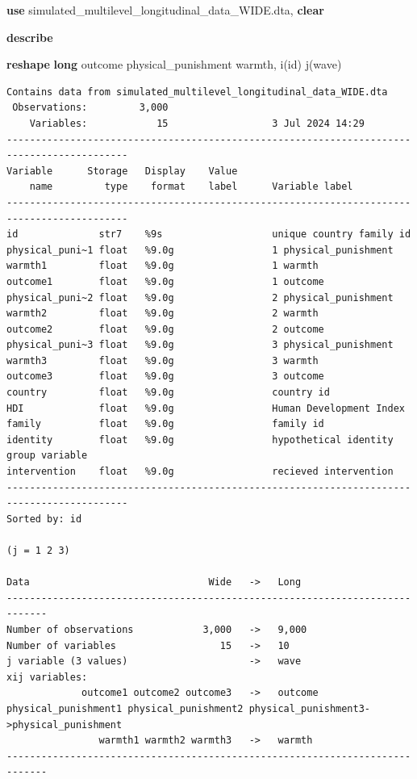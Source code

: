 \documentclass[
  letterpaper,
  DIV=11,
  numbers=noendperiod]{scrreprt}
\newenvironment{Shaded}{\begin{snugshade}}{\end{snugshade}}
\newcommand{\KeywordTok}[1]{\textcolor[rgb]{0.00,0.23,0.31}{\textbf{#1}}}
\newcommand{\NormalTok}[1]{\textcolor[rgb]{0.00,0.23,0.31}{#1}}
\begin{document}
\begin{Shaded}
\begin{Highlighting}[]

\KeywordTok{use}\NormalTok{ simulated\_multilevel\_longitudinal\_data\_WIDE.dta, }\KeywordTok{clear}

\KeywordTok{describe}

\KeywordTok{reshape} \KeywordTok{long}\NormalTok{ outcome physical\_punishment warmth, i(id) j(wave)}
\end{Highlighting}
\end{Shaded}

\begin{verbatim}
Contains data from simulated_multilevel_longitudinal_data_WIDE.dta
 Observations:         3,000                  
    Variables:            15                  3 Jul 2024 14:29
-------------------------------------------------------------------------------------------
Variable      Storage   Display    Value
    name         type    format    label      Variable label
-------------------------------------------------------------------------------------------
id              str7    %9s                   unique country family id
physical_puni~1 float   %9.0g                 1 physical_punishment
warmth1         float   %9.0g                 1 warmth
outcome1        float   %9.0g                 1 outcome
physical_puni~2 float   %9.0g                 2 physical_punishment
warmth2         float   %9.0g                 2 warmth
outcome2        float   %9.0g                 2 outcome
physical_puni~3 float   %9.0g                 3 physical_punishment
warmth3         float   %9.0g                 3 warmth
outcome3        float   %9.0g                 3 outcome
country         float   %9.0g                 country id
HDI             float   %9.0g                 Human Development Index
family          float   %9.0g                 family id
identity        float   %9.0g                 hypothetical identity group variable
intervention    float   %9.0g                 recieved intervention
-------------------------------------------------------------------------------------------
Sorted by: id

(j = 1 2 3)

Data                               Wide   ->   Long
-----------------------------------------------------------------------------
Number of observations            3,000   ->   9,000       
Number of variables                  15   ->   10          
j variable (3 values)                     ->   wave
xij variables:
             outcome1 outcome2 outcome3   ->   outcome
physical_punishment1 physical_punishment2 physical_punishment3->physical_punishment
                warmth1 warmth2 warmth3   ->   warmth
-----------------------------------------------------------------------------
\end{verbatim}
\end{document}
